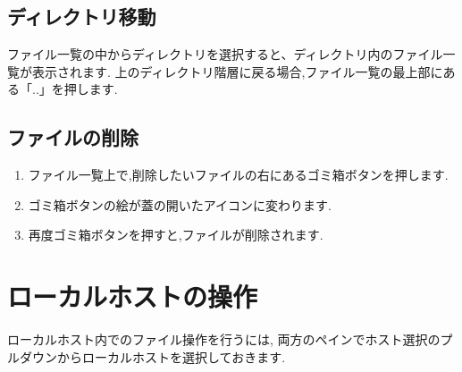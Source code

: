 \documentclass[a4paper,10pt,oneside]{jsbook}
\begin{document}
\newpage

\subsection{ディレクトリ移動}
ファイル一覧の中からディレクトリを選択すると、ディレクトリ内のファイル一覧が表示されます.
上のディレクトリ階層に戻る場合,ファイル一覧の最上部にある「..」を押します.

\subsection{ファイルの削除}
\begin{enumerate}
	\item ファイル一覧上で,削除したいファイルの右にあるゴミ箱ボタンを押します.
	\item ゴミ箱ボタンの絵が蓋の開いたアイコンに変わります.
	\item 再度ゴミ箱ボタンを押すと,ファイルが削除されます.
\end{enumerate}

\section{ローカルホストの操作}
ローカルホスト内でのファイル操作を行うには,
両方のペインでホスト選択のプルダウンからローカルホストを選択しておきます.
\end{document}

